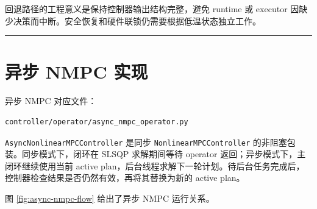 \documentclass[UTF8,openany,zihao=-4,oneside]{ctexbook}
\providecommand{\passthrough}[1]{#1}
\newcommand{\manualdivider}{\par\vspace{0.6em}\noindent\textcolor{FGLine}{\rule{\linewidth}{0.7pt}}\vspace{0.6em}\par}
\begin{document}
回退路径的工程意义是保持控制器输出结构完整，避免 runtime 或 executor 因缺少决策而中断。安全恢复和硬件联锁仍需要根据低温状态独立工作。

\manualdivider

\section{异步 NMPC 实现}\label{sec:async-nmpc-implementation}

异步 NMPC 对应文件：

\begin{lstlisting}
controller/operator/async_nmpc_operator.py
\end{lstlisting}

\passthrough{\lstinline!AsyncNonlinearMPCController!} 是同步 \passthrough{\lstinline!NonlinearMPCController!} 的非阻塞包装。同步模式下，闭环在 SLSQP 求解期间等待 operator 返回；异步模式下，主闭环继续使用当前 active plan，后台线程求解下一轮计划。待后台任务完成后，控制器检查结果是否仍然有效，再将其替换为新的 active plan。

图 \ref{fig:async-nmpc-flow} 给出了异步 NMPC 运行关系。
\end{document}
